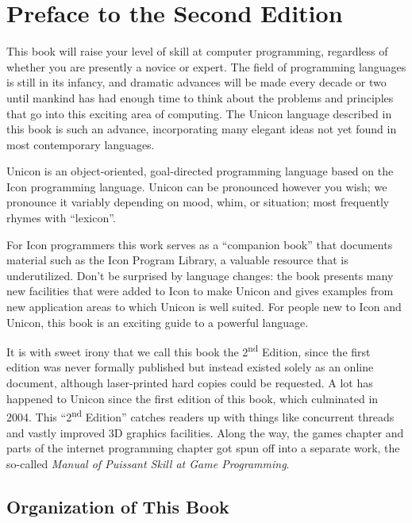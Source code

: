 \chapter{Preface to the Second Edition}

This book will raise your level of skill at computer programming,
regardless of whether you are presently a novice or expert. The field
of programming languages is still in its infancy, and dramatic advances
will be made every decade or two until mankind has had enough time to
think about the problems and principles that go into this exciting area
of computing. The Unicon language described in this book is such an
advance, incorporating many elegant ideas not yet found in most
contemporary languages.

Unicon is an object-oriented, goal-directed programming language based
on the Icon programming language. Unicon can be pronounced however you
wish; we pronounce it variably depending on mood, whim, or situation;
most frequently rhymes with ``lexicon''.

For Icon programmers this work serves as a ``companion book'' that documents
material such as the Icon Program Library, a valuable resource that is
underutilized.  Don't be surprised by language changes: the book presents many
new facilities that were added to Icon to make Unicon and gives examples from
new application areas to which Unicon is well suited. For people new to Icon
and Unicon, this book is an exciting guide to a powerful language.

It is with sweet irony that we call this book the 2\textsuperscript{nd}
Edition, since the first edition was never formally published but
instead existed solely as an online document, although laser-printed
hard copies could be requested. A lot has happened to Unicon since the
first edition of this book, which culminated in 2004. This
{\textquotedblleft}2\textsuperscript{nd} Edition{\textquotedblright}
catches readers up with things like concurrent threads and vastly
improved 3D graphics facilities. Along the way, the games chapter and
parts of the internet programming chapter got spun off into a separate
work, the so-called \textit{Manual of Puissant Skill at Game
Programming}. 

\section*{Organization of This Book}

